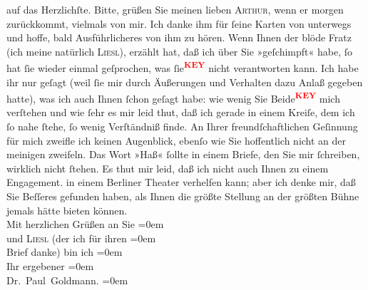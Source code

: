 \begin{ledgroupsized}[t]{13cm}
               auf das Herzlichſte.\pend
           \pstart
           Bitte, grüßen Sie meinen lieben \textsc{Arthur}, wenn er morgen zurückkommt, vielmals von mir. Ich  danke ihm für ſeine Karten von unterwegs und hoffe,
               bald Ausführlicheres von ihm zu hören.\pend
           \pstart
           Wenn Ihnen der blöde Fratz (ich meine natürlich \textsc{Liesl}), erzählt hat, daß ich über Sie »geſchimpft« habe, ſo hat ſie wieder einmal {\pb} geſprochen, was ſie\textcolor{red}{\textsuperscript{\textbf{KEY}}} nicht verantworten kann. Ich habe ihr nur geſagt
               (weil ſie mir durch Äußerungen und Verhalten dazu Anlaß gegeben hatte), was ich auch
               Ihnen ſchon geſagt habe: wie wenig Sie Beide\textcolor{red}{\textsuperscript{\textbf{KEY}}} mich verſtehen und wie ſehr es 
               mir leid thut, daß ich gerade in einem Kreiſe, dem ich ſo nahe ſtehe, ſo wenig Verſtändniß finde. An
               Ihrer freundſchaftlichen Geſinnung für mich zweifle ich keinen Augenblick, ebenſo wie
               Sie hoffentlich nicht an der meinigen zweifeln. Das Wort »Haß« ſollte in einem
               Briefe, den Sie mir ſchreiben, wirklich nicht ſtehen. {\pb}\pend
           \pstart
           Es thut mir leid, daß ich nicht auch Ihnen zu einem Engagement. in einem Berliner Theater verhelfen kann; aber ich\strikeout{\textcolor{gray}{d}} denke mir, daß Sie Beſſeres gefunden haben, als Ihnen die größte Stellung an
               der größten Bühne jemals hätte bieten können. {\\[\baselineskip]}Mit herzlichen Grüßen an
               Sie\pend
           \leftskip=0em{}\pstart
           {\\[\baselineskip]}und \textsc{Liesl} (der ich für ihren\pend
           \leftskip=0em{}\pstart
           {\\[\baselineskip]}Brief danke) bin ich\pend
           \leftskip=0em{}\pstart
           {\\[\baselineskip]}Ihr ergebener\pend
           \leftskip=0em{}\pstart
           {\\[\baselineskip]}\spacefill\mbox{Dr. Paul Goldmann.}\pend
           \leftskip=0em{}
         
         \endnumbering{}\end{ledgroupsized}\begin{anhang}\end{anhang}\newcommand{\dateiname}{L03532}\newcommand{\titel}{Paul Goldmann an Olga XXXX Gussmann/Schnitzler, 9. 7. [XXXX]}\newcommand{\editorInnen}{Martin Anton Müller und Laura Untner}
      